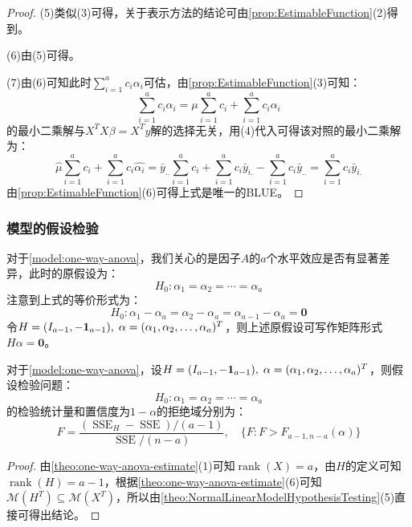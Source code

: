 \begin{proof}
	(5)类似(3)可得，关于表示方法的结论可由\cref{prop:EstimableFunction}(2)得到。\par
	(6)由(5)可得。\par
	(7)由(6)可知此时$\sum\limits_{i=1}^{a}c_i\alpha_i$可估，由\cref{prop:EstimableFunction}(3)可知：
	\begin{equation*}
		\sum_{i=1}^{a}c_i\alpha_i=\mu\sum_{i=1}^{a}c_i+\sum_{i=1}^{a}c_i\alpha_i
	\end{equation*}
	的最小二乘解与$X^TX\beta=X^Ty$解的选择无关，用(4)代入可得该对照的最小二乘解为：
	\begin{equation*}
		\hat{\mu}\sum_{i=1}^{a}c_i+\sum_{i=1}^{a}c_i\hat{\alpha_i}=	\bar{y}_{..}\sum_{i=1}^{a}c_i+\sum_{i=1}^{a}c_i\bar{y}_{i.}-\sum_{i=1}^{a}c_i\bar{y}_{..}=\sum_{i=1}^{a}c_i\bar{y}_{i.}
	\end{equation*}
	由\cref{prop:EstimableFunction}(6)可得上式是唯一的BLUE。
\end{proof}

\subsubsection{模型的假设检验}
\begin{note}
	对于\cref{model:one-way-anova}，我们关心的是因子$A$的$a$个水平效应是否有显著差异，此时的原假设为：
	\begin{equation*}
		H_0:\alpha_1=\alpha_2=\cdots=\alpha_a
	\end{equation*}
	注意到上式的等价形式为：
	\begin{equation*}
		H_0:\alpha_1-\alpha_a=\alpha_2-\alpha_a=\alpha_{a-1}-\alpha_a=\mathbf{0}
	\end{equation*}
	令$H=(I_{a-1},-\mathbf{1}_{a-1}),\;\alpha=(\alpha_1, \alpha_2, \dots, \alpha_{a})^T$，则上述原假设可写作矩阵形式$H\alpha=\mathbf{0}$。
\end{note}
\begin{theorem}\label{theo:AOVHypothesisTesting}
	对于\cref{model:one-way-anova}，设$H=(I_{a-1},-\mathbf{1}_{a-1}),\;\alpha=(\alpha_1, \alpha_2, \dots, \alpha_{a})^T$，则假设检验问题：
	\begin{equation*}
		H_0:\alpha_1=\alpha_2=\cdots=\alpha_a
	\end{equation*}
	的检验统计量和置信度为$1-\alpha$的拒绝域分别为：
	\begin{equation*}
		F=\frac{(\operatorname{SSE}_H-\operatorname{SSE})/(a-1)}{\operatorname{SSE}/(n-a)},\quad\{F:F>F_{a-1,n-a}(\alpha)\}
	\end{equation*}
\end{theorem}
\begin{proof}
	由\cref{theo:one-way-anova-estimate}(1)可知$\operatorname{rank}(X)=a$，由$H$的定义可知$\operatorname{rank}(H)=a-1$，根据\cref{theo:one-way-anova-estimate}(6)可知$\mathcal{M}(H^T)\subseteq\mathcal{M}(X^T)$，所以由\cref{theo:NormalLinearModelHypothesisTesting}(5)直接可得出结论。
\end{proof}
